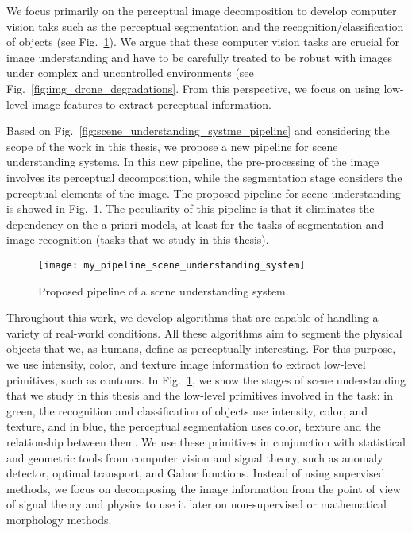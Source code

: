 We focus primarily on the perceptual image decomposition to develop computer vision taks such as the perceptual segmentation and the recognition/classification of objects (see Fig.\ \ref{fig:my_scene_understanding_systme_pipeline}). We argue that these computer vision tasks are crucial for image understanding and have to be carefully treated to be robust with images under complex and uncontrolled environments (see Fig.\ \ref{fig:img_drone_degradations}. From this perspective, we focus on using low-level image features to extract perceptual information. 

Based on Fig.\ \ref{fig:scene_understanding_systme_pipeline} and considering the scope of the work in this thesis, we propose a new pipeline for scene understanding systems. In this new pipeline, the pre-processing of the image involves its perceptual decomposition, while the segmentation stage considers the perceptual elements of the image. The proposed pipeline for scene understanding is showed in Fig.\ \ref{fig:my_scene_understanding_systme_pipeline}. The peculiarity of this pipeline is that it eliminates the dependency on the a priori models, at least for the tasks of segmentation and image recognition (tasks that we study in this thesis). 

\begin{figure}[!ht]
    \centering
    \texttt{[image: my\_pipeline\_scene\_understanding\_system]}        
    \caption{Proposed pipeline of a scene understanding system.}\label{fig:my_scene_understanding_systme_pipeline}
\end{figure}

Throughout this work, we develop algorithms that are capable of handling a variety of real-world conditions. All these algorithms aim to segment the physical objects that we, as humans, define as perceptually interesting. For this purpose, we use intensity, color, and texture image information to extract low-level primitives, such as contours. In Fig.\ \ref{fig:my_scene_understanding_systme_pipeline}, we show the stages of scene understanding that we study in this thesis and the low-level primitives involved in the task: in green, the recognition and classification of objects use intensity, color, and texture, and in blue, the perceptual segmentation uses color, texture and the relationship between them. We use these primitives in conjunction with statistical and geometric tools from computer vision and signal theory, such as anomaly detector, optimal transport, and Gabor functions. Instead of using supervised methods, we focus on decomposing the image information from the point of view of signal theory and physics to use it later on non-supervised or mathematical morphology methods.

